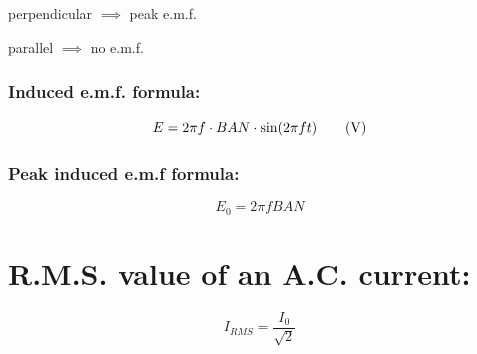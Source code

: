 \documentclass[11pt]{article}
\begin{document}
\begin{multicols}{2}
	\begin{center}
		perpendicular $\implies$ peak e.m.f.
	\end{center}
	\begin{center}
		parallel $\implies$ no e.m.f.
	\end{center}
\end{multicols}

\subsubsection{Induced e.m.f. formula: }
\begin{equation}
	E=2\pi f\cdot BAN \cdot\sin(2\pi f t)\tag{\si{\volt}}
\end{equation}

\subsubsection{Peak induced e.m.f formula: }
\begin{equation}
	E_0 = 2\pi fBAN\tag{\si\volt}
\end{equation}
\section{R.M.S. value of an A.C. current: }
\begin{equation}
	I_{RMS} = \frac{I_0}{\sqrt2}
\end{equation}
\end{document}
